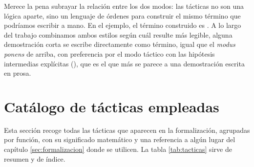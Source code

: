 Merece la pena subrayar la relación entre los dos modos: las tácticas no son una lógica aparte, sino un lenguaje de órdenes para construir el mismo término que podríamos escribir a mano. En el ejemplo, el término construido es . A lo largo del trabajo combinamos ambos estilos según cuál resulte más legible, alguna demostración corta se escribe directamente como término, igual que el \emph{modus ponens} de arriba, con preferencia por el modo táctico con las hipótesis intermedias explícitas (), que es el que más se parece a una demostración escrita en prosa.

\section{Catálogo de tácticas empleadas}\label{sec:tacticas}

Esta sección recoge todas las tácticas que aparecen en la formalización, agrupadas por función, con su significado matemático y una referencia a algún lugar del capítulo \ref{sec:formalizacion} donde se utilicen. La tabla \ref{tab:tacticas} sirve de resumen y de índice.

